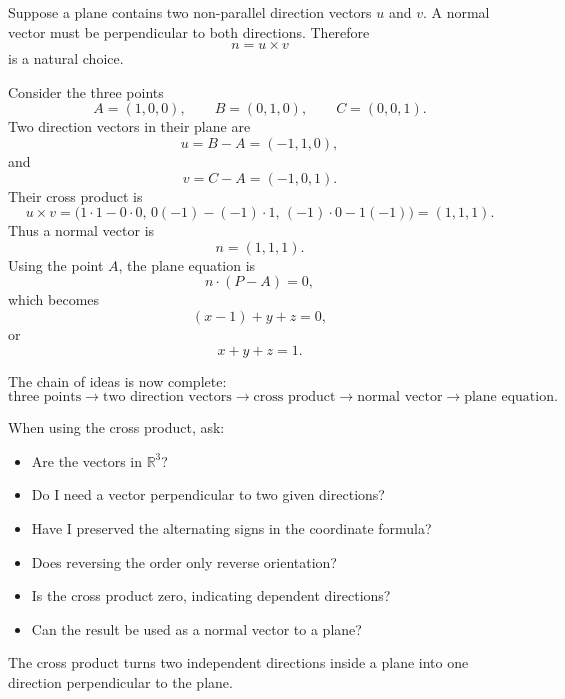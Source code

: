 Suppose a plane contains two non-parallel direction vectors \(u\) and \(v\). A normal vector must be perpendicular to both directions. Therefore
\[
n=u\times v
\]
is a natural choice.

\begin{examplebox}
Consider the three points
\[
A=(1,0,0),
\qquad
B=(0,1,0),
\qquad
C=(0,0,1).
\]
Two direction vectors in their plane are
\[
u=B-A=(-1,1,0),
\]
and
\[
v=C-A=(-1,0,1).
\]
Their cross product is
\[
u\times v
=
\bigl(
1\cdot1-0\cdot0,\,
0(-1)-(-1)\cdot1,\,
(-1)\cdot0-1(-1)
\bigr)
=
(1,1,1).
\]
Thus a normal vector is
\[
n=(1,1,1).
\]
Using the point \(A\), the plane equation is
\[
n\cdot(P-A)=0,
\]
which becomes
\[
(x-1)+y+z=0,
\]
or
\[
x+y+z=1.
\]
\end{examplebox}

The chain of ideas is now complete:
\[
\text{three points}
\longrightarrow
\text{two direction vectors}
\longrightarrow
\text{cross product}
\longrightarrow
\text{normal vector}
\longrightarrow
\text{plane equation}.
\]

\begin{summarybox}
When using the cross product, ask:
\begin{itemize}
\item Are the vectors in \(\mathbb{R}^3\)?
\item Do I need a vector perpendicular to two given directions?
\item Have I preserved the alternating signs in the coordinate formula?
\item Does reversing the order only reverse orientation?
\item Is the cross product zero, indicating dependent directions?
\item Can the result be used as a normal vector to a plane?
\end{itemize}
\end{summarybox}

The cross product turns two independent directions inside a plane into one direction perpendicular to the plane.
